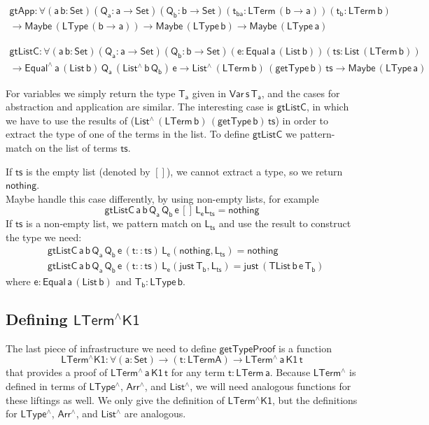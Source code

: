 \documentclass[acmsmall,screen,review,anonymous]{acmart}
\theoremstyle{definition}
\begin{document}
\begin{multline*}
    \mathsf{gtApp : \forall (a \, b : Set) (Q_a : a \to Set) (Q_b : b \to Set) 
      (t_{ba} : LTerm\, (b \to a)) (t_b : LTerm\, b)} \\ 
    \mathsf{
      \to Maybe\, (LType\, (b \to a))
      \to Maybe\, (LType\, b)
      \to Maybe\, (LType\, a)
    }
\end{multline*}


\begin{multline*}
    \mathsf{gtListC : \forall (a \, b : Set) (Q_a : a \to Set) (Q_b : b \to Set) 
      (e : Equal\, a\, (List\, b)) (ts : List\, (LTerm\, b))} \\ 
    \mathsf{
      \to Equal^{\wedge}\, a\, (List\,b) \, Q_a\, (List^{\wedge}\, b\, Q_b)\, e
      \to List^{\wedge}\, (LTerm\, b)\, (getType\, b)\, ts
      \to Maybe\, (LType\, a)
    }
\end{multline*}


For variables we simply return the type $\mathsf{T_a}$ given in $\mathsf{Var\, s\, T_a}$, 
and the cases for abstraction and application are similar.
The interesting case is $\mathsf{gtListC}$, in which we have to use 
the results of ($\mathsf{List^{\wedge}\, (LTerm\, b)\, (getType\, b)\, ts}$)
in order to extract the type of one of the terms in the list. 
To define $\mathsf{gtListC}$ we pattern-match on the list of terms $\mathsf{ts}$.  

If $\mathsf{ts}$ is the empty list (denoted by $\mathsf{[]}$), we cannot extract a type, 
so we return $\mathsf{nothing}$. \\
{\color{red} Maybe handle this case differently, by using non-empty lists, for example}
\[
  \mathsf{gtListC\, a\, b\, Q_a\, Q_b\, e\, [] \, L_e L_{ts} = nothing}
\]
If $\mathsf{ts}$ is a non-empty list, we pattern match on $\mathsf{L_{ts}}$ and use the result
to construct the type we need:
\begin{align*}
  &\mathsf{gtListC\, a\, b\, Q_a\, Q_b\, e\, (t :: ts) \, L_e (nothing , L_{ts}) = nothing} \\
  &\mathsf{gtListC\, a\, b\, Q_a\, Q_b\, e\, (t :: ts) \, L_e (just\, T_b , L_{ts}) = just \, (TList\, b\, e\, T_b)}
\end{align*}
where $\mathsf{e : Equal\, a\, (List\,b)}$ and $\mathsf{T_b : LType\, b}$. 

\subsection{Defining $\mathsf{LTerm^{\wedge}K1}$}
The last piece of infrastructure we need to define $\mathsf{getTypeProof}$ is a function 
\[
  \mathsf{LTerm^{\wedge}K1 : \forall (a : Set) \to (t : LTerm A) \to LTerm^{\wedge}\, a\, K1\,t}
\]
that provides a 
proof of $\mathsf{LTerm^{\wedge}\,a\,K1\,t}$ for any term $\mathsf{t : LTerm\, a}$. 
Because $\mathsf{LTerm^{\wedge}}$ is defined in terms of $\mathsf{LType^{\wedge}}$, $\mathsf{Arr^{\wedge}}$, 
and $\mathsf{List^{\wedge}}$, we will need analogous functions for these liftings as well. 
We only give the definition of $\mathsf{LTerm^{\wedge}K1}$, but the definitions for 
$\mathsf{LType^{\wedge}}$, $\mathsf{Arr^{\wedge}}$, and $\mathsf{List^{\wedge}}$ are analogous. 
\end{document}
